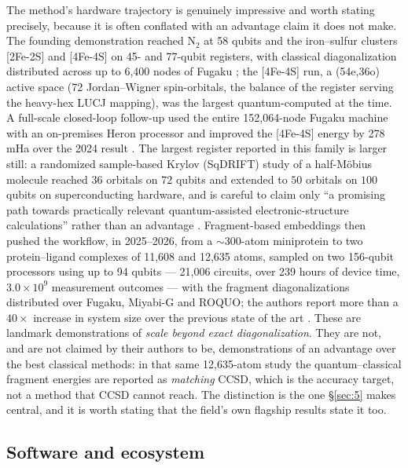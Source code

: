 \documentclass[onecolumn,a4paper]{quantumarticle}
\begin{document}
The method's hardware trajectory is genuinely impressive and worth stating precisely, because it is often conflated with an advantage claim it does not make. The founding demonstration reached N$_2$ at 58 qubits and the iron--sulfur clusters [2Fe-2S] and [4Fe-4S] on 45- and 77-qubit registers, with classical diagonalization distributed across up to 6,400 nodes of Fugaku \cite{robledomoreno2025}; the [4Fe-4S] run, a (54e,36o) active space (72 Jordan--Wigner spin-orbitals, the balance of the register serving the heavy-hex LUCJ mapping), was the largest quantum-computed at the time. A full-scale closed-loop follow-up used the entire 152,064-node Fugaku machine with an on-premises Heron processor and improved the [4Fe-4S] energy by 278 mHa over the 2024 result \cite{shirakawa2025}. The largest register reported in this family is larger still: a randomized sample-based Krylov (SqDRIFT) study of a half-M\"obius molecule reached $36$ orbitals on $72$ qubits and extended to $50$ orbitals on $100$ qubits on superconducting hardware, and is careful to claim only ``a promising path towards practically relevant quantum-assisted electronic-structure calculations'' rather than an advantage \cite{piccinelli2026}. Fragment-based embeddings then pushed the workflow, in 2025--2026, from a $\sim$300-atom miniprotein to two protein--ligand complexes of 11,608 and 12,635 atoms, sampled on two 156-qubit processors using up to 94 qubits --- 21,006 circuits, over 239 hours of device time, $3.0\times10^{9}$ measurement outcomes --- with the fragment diagonalizations distributed over Fugaku, Miyabi-G and ROQUO; the authors report more than a $40\times$ increase in system size over the previous state of the art \cite{merz2026}. These are landmark demonstrations of \emph{scale beyond exact diagonalization}. They are not, and are not claimed by their authors to be, demonstrations of an advantage over the best classical methods: in that same 12,635-atom study the quantum--classical fragment energies are reported as \emph{matching} CCSD, which is the accuracy target, not a method that CCSD cannot reach. The distinction is the one \S\ref{sec:5} makes central, and it is worth stating that the field's own flagship results state it too.


\subsection{Software and ecosystem}\label{sec:2-4}
\end{document}
